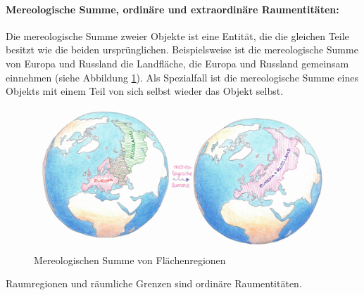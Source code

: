     \paragraph{Mereologische Summe, ordinäre und extraordinäre Raumentitäten:}
        Die
        mereologische Summe zweier Objekte ist eine Entität, die die gleichen Teile besitzt wie die beiden ursprünglichen.
        Beispielsweise ist die mereologische Summe von Europa und Russland die Landfläche, die Europa und Russland gemeinsam einnehmen (siehe Abbildung \ref{fig:mereologische-summe}).
        Als Spezialfall ist die mereologische Summe eines Objekts mit einem Teil von sich selbst wieder das Objekt selbst.
        \begin{figure}[ht]
            \centering
            \includegraphics[width=\textwidth]{gfx/mereologische-summe.png}
            \caption{Mereologischen Summe von Flächenregionen}
            \label{fig:mereologische-summe}
        \end{figure}
		Raumregionen und räumliche Grenzen sind ordinäre Raumentitäten.

